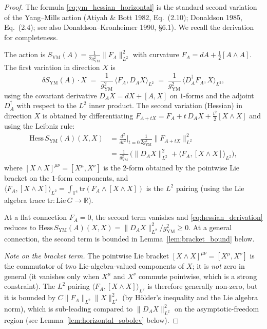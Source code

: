 \begin{proof}
The formula \eqref{eq:ym_hessian_horizontal} is the standard
second variation of the Yang--Mills action (Atiyah \& Bott
1982, Eq.~(2.10); Donaldson 1985, Eq.~(2.4); see also
Donaldson--Kronheimer 1990, \S 6.1). We recall the derivation
for completeness.

The action is $S_{\mathrm{YM}}(A)=\tfrac{1}{2g_{\mathrm{YM}}^{2}}
\|F_{A}\|_{L^{2}}^{2}$ with curvature
$F_{A}=dA+\tfrac{1}{2}[A\wedge A]$. The first variation in
direction $X$ is
\begin{equation*}
  \delta S_{\mathrm{YM}}(A)\cdot X
  \;=\;\frac{1}{g_{\mathrm{YM}}^{2}}\,
  \langle F_{A},D_{A}X\rangle_{L^{2}}
  \;=\;\frac{1}{g_{\mathrm{YM}}^{2}}\,
  \langle D_{A}^{\dagger}F_{A},X\rangle_{L^{2}},
\end{equation*}
using the covariant derivative $D_{A}X=dX+[A,X]$ on $1$-forms
and the adjoint $D_{A}^{\dagger}$ with respect to the $L^{2}$
inner product. The second variation (Hessian) in direction
$X$ is obtained by differentiating $F_{A+tX}=F_{A}+t\,D_{A}X
+\tfrac{t^{2}}{2}[X\wedge X]$ and using the Leibniz rule:
\begin{align}
\label{eq:hessian_derivation}
  \mathrm{Hess}\,S_{\mathrm{YM}}(A)(X,X)
  &=\frac{d^{2}}{dt^{2}}\bigg|_{t=0}
  \frac{1}{2g_{\mathrm{YM}}^{2}}\|F_{A+tX}\|_{L^{2}}^{2}\\
  &=\frac{1}{g_{\mathrm{YM}}^{2}}\,
  \bigl(\|D_{A}X\|_{L^{2}}^{2}
  +\langle F_{A},[X\wedge X]\rangle_{L^{2}}\bigr),
\end{align}
where $[X\wedge X]^{\mu\nu}=[X^{\mu},X^{\nu}]$ is the
$2$-form obtained by the pointwise Lie bracket on the
$1$-form components, and
$\langle F_{A},[X\wedge X]\rangle_{L^{2}}=
\int_{\mathbb{T}^{4}}\mathrm{tr}(F_{A}\wedge[X\wedge X])$ is
the $L^{2}$ pairing (using the Lie algebra trace
$\mathrm{tr}:\mathrm{Lie}\,G\to\mathbb{R}$).

At a flat connection $F_{A}=0$, the second term vanishes and
\eqref{eq:hessian_derivation} reduces to
$\mathrm{Hess}\,S_{\mathrm{YM}}(A)(X,X)=\|D_{A}X\|_{L^{2}}^{2}/
g_{\mathrm{YM}}^{2}\ge 0$. At a general connection, the second
term is bounded in
Lemma~\ref{lem:bracket_bound} below.

\emph{Note on the bracket term.} The pointwise Lie bracket
$[X\wedge X]^{\mu\nu}=[X^{\mu},X^{\nu}]$ is the commutator of
two Lie-algebra-valued components of $X$; it is \emph{not} zero
in general (it vanishes only when $X^{\mu}$ and $X^{\nu}$
commute pointwise, which is a strong constraint). The
$L^{2}$ pairing $\langle F_{A},[X\wedge X]\rangle_{L^{2}}$ is
therefore generally non-zero, but it is bounded by
$C\|F_{A}\|_{L^{2}}\|X\|_{L^{4}}^{2}$ (by H\"older's inequality
and the Lie algebra norm), which is sub-leading compared to
$\|D_{A}X\|_{L^{2}}^{2}$ on the asymptotic-freedom region
(see Lemma~\ref{lem:horizontal_sobolev} below).
\end{proof}


